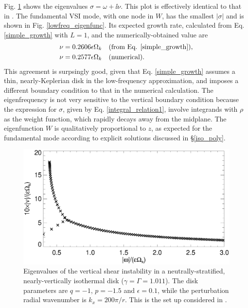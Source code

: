 Fig. \ref{lowfreq_eigen} shows the eigenvalues $\sigma = \omega +
\ii\nu$. This plot is effectively identical to that in
\cite{mcnally14}. The fundamental VSI mode, with one node in $W$, has
the smallest $|\sigma|$ and is shown in Fig. \ref{lowfreq_eigenfunc}.  
Its expected growth rate, calculated from Eq. \ref{simple_growth} with  
$L=1$, and the numerically-obtained value are 
\begin{align*}
  \nu = 0.2606\epsilon\Omega_k &\quad \text{(from
    Eq. \ref{simple_growth})},\\
  \nu = 0.2577 \epsilon \Omega_k &\quad \text{(numerical)}.
\end{align*}
This agreement is surpsingly good, given that
Eq. \ref{simple_growth} assumes a thin, nearly-Keplerian disk in the 
low-frequency approximation, and
imposes a different boundary condition to that in the numerical
calculation. The eigenfrequency is not very sensitive to the vertical boundary
condition because the expression for $\sigma$, given by
Eq. \ref{integral_relation1}, involve integrands with $\rho$ as the 
weight function, which rapidly decays away from the midplane. The
eigenfunction $W$ is qualitatively proportional to 
$z$, as expected for the fundamental mode according to explicit
solutions discussed in \S\ref{iso_poly}.    

\begin{figure}
  \includegraphics[width=\linewidth]{figures/eigenvalues_iso}
  \caption{Eigenvalues of the
    vertical shear instability in a neutrally-stratified,
    nearly-vertically isothermal disk  ($\gamma=\Gamma=1.011$). The
    disk parameters are $q=-1$,  
    $p=-1.5$ and $\epsilon=0.1$, while the perturbation radial
    wavenumber is $k_x=200\pi/r$. This is the set up considered in
    \cite{mcnally14}. \label{lowfreq_eigen}
  }
\end{figure}

